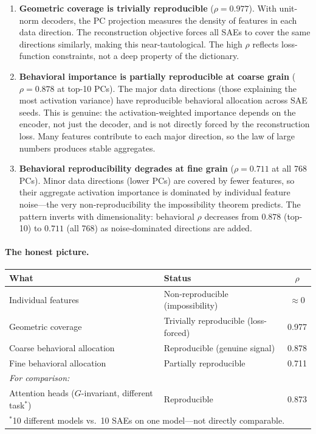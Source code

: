 \documentclass{article}
\begin{document}
\begin{enumerate}
\item \textbf{Geometric coverage is trivially reproducible} ($\rho = 0.977$). With unit-norm decoders, the PC projection measures the density of features in each data direction. The reconstruction objective forces all SAEs to cover the same directions similarly, making this near-tautological. The high $\rho$ reflects loss-function constraints, not a deep property of the dictionary.

\item \textbf{Behavioral importance is partially reproducible at coarse grain} ($\rho = 0.878$ at top-10 PCs). The major data directions (those explaining the most activation variance) have reproducible behavioral allocation across SAE seeds. This is genuine: the activation-weighted importance depends on the encoder, not just the decoder, and is not directly forced by the reconstruction loss. Many features contribute to each major direction, so the law of large numbers produces stable aggregates.

\item \textbf{Behavioral reproducibility degrades at fine grain} ($\rho = 0.711$ at all 768 PCs). Minor data directions (lower PCs) are covered by fewer features, so their aggregate activation importance is dominated by individual feature noise---the very non-reproducibility the impossibility theorem predicts. The pattern inverts with dimensionality: behavioral $\rho$ decreases from $0.878$ (top-10) to $0.711$ (all 768) as noise-dominated directions are added.
\end{enumerate}

\paragraph{The honest picture.}
\begin{center}
\small
\begin{tabular}{@{}llc@{}}
\toprule
\textbf{What} & \textbf{Status} & \textbf{$\rho$} \\
\midrule
Individual features & Non-reproducible (impossibility) & $\approx 0$ \\
Geometric coverage & Trivially reproducible (loss-forced) & 0.977 \\
Coarse behavioral allocation & Reproducible (genuine signal) & 0.878 \\
Fine behavioral allocation & Partially reproducible & 0.711 \\
\midrule
\emph{For comparison:} \\
Attention heads ($G$-invariant, different task$^*$) & Reproducible & 0.873 \\
\bottomrule
\multicolumn{3}{l}{\footnotesize $^*$10 different models vs.\ 10 SAEs on one model---not directly comparable.}
\end{tabular}
\end{center}
\end{document}
